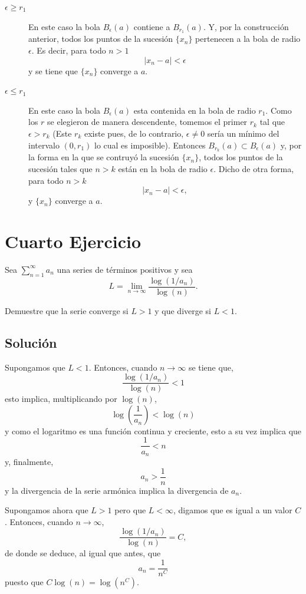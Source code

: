\documentclass[fleqn,leqno,11pt,letterpaper,final]{article}
\begin{document}
\begin{description}
	\item[$\epsilon\geq r_1$] 
		En este caso la bola $B_\epsilon(a)$ contiene a $B_{r_1}(a)$. 
		Y, por la construcción anterior, todos los puntos de la sucesión $\{ x_n \}$
		pertenecen a la bola de radio $\epsilon$. Es decir, para todo $n>1$
		\[
			\left\lvert x_n-a \right\rvert<\epsilon
		\]
		y se tiene que $\{ x_n \}$ converge a $a$.
	\item[$\epsilon\leq r_1$] 
		En este caso la bola $B_{\epsilon}(a)$ esta contenida en la bola de radio
		$r_1$. Como los $r$ se elegieron de manera descendente, tomemos el primer
		$r_k$ tal que $\epsilon>r_k$ 
		(Este $r_k$ existe pues, de lo contrario, $\epsilon\neq 0$ sería un mínimo del intervalo $(0,r_1)$ lo cual es imposible).
		Entonces $B_{r_k}(a)\subset B_\epsilon(a)$ y, por la forma en la que se contruyó la
		sucesión $\{ x_n \}$, todos los puntos de la sucesión tales que $n>k$ están
		en la bola de radio $\epsilon$. Dicho de otra forma, para todo $n>k$
		\[
			\left\lvert x_n-a \right\rvert<\epsilon,
		\]
		y $\{ x_n \}$ converge a $a$.
\end{description}

\section{Cuarto Ejercicio}%
\label{sec:Cuarto Ejercicio}
Sea $ \sum_{n=1}^{\infty}a_n $ una series de términos positivos y sea
\[
	L= \lim_{n \to \infty} \frac{\log(1/a_n)}{\log(n)}.
\]

Demuestre que la serie converge si $L>1$ y que diverge si $L<1$.

\subsection{Solución}
Supongamos que $L<1$. Entonces, cuando $n\to\infty$ se tiene que,
\[
	\frac{\log(1/a_n)}{\log(n)} < 1
\]
esto implica, multiplicando por $\log(n)$,
\[
	\log\left( \frac{1}{a_n} \right) < \log(n)
\]
y como el logaritmo es una función continua y creciente, esto
a su vez implica que
\[
	\frac{1}{a_n} < n
\]
y, finalmente,
\[
	a_n> \frac{1}{n} 
\]
y la divergencia de la serie armónica implica la divergencia de $a_n$.

Supongamos ahora que $L>1$ pero que $L<\infty$, digamos que es igual a un valor $C$.
Entonces, cuando $n\to\infty$,
\[
	\frac{\log(1/a_n)}{\log(n)} = C,
\]
de donde se deduce, al igual que antes, que
\[
	a_n= \frac{1}{n^C} 
\]
puesto que $C\log(n)=\log(n^C)$.
\end{document}
